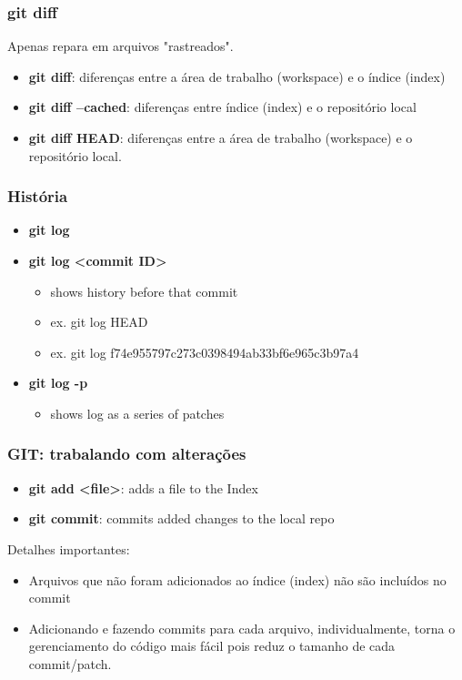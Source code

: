 \documentclass{beamer}
\begin{document}
\begin{frame}
\frametitle{git diff}


Apenas repara em arquivos "rastreados".

\begin{itemize}
\item \textbf{git diff}: diferenças entre a área de trabalho (workspace) e o índice (index)
\item \textbf{git diff --cached}: diferenças entre índice (index) e o repositório local
\item \textbf{git diff HEAD}: diferenças entre a área de trabalho (workspace) e o repositório local.
\end{itemize}
\end{frame}

\begin{frame}
\frametitle{História}

\begin{itemize}
\item \textbf{git log}
\item \textbf{git log <commit ID>}
\begin{itemize}
\item shows history before that commit
\item ex. git log HEAD
\item ex.  git log f74e955797c273c0398494ab33bf6e965c3b97a4
\end{itemize}
\item \textbf{git log -p}
\begin{itemize}
\item shows log as a series of patches
\end{itemize}
\end{itemize}

\end{frame}


\begin{frame}
\frametitle{GIT: trabalando com alterações}


\begin{itemize}
\item \textbf{git add <file>}: adds a file to the Index
\item \textbf{git commit}:  commits added changes to the local repo
\end{itemize}

Detalhes importantes:

\begin{itemize}
\item Arquivos que não foram adicionados ao índice (index) não são incluídos no commit
\item Adicionando e fazendo commits para cada arquivo, individualmente, torna o gerenciamento do código mais fácil pois reduz o tamanho de cada commit/patch.
\end{itemize}

\end{frame}
\end{document}

